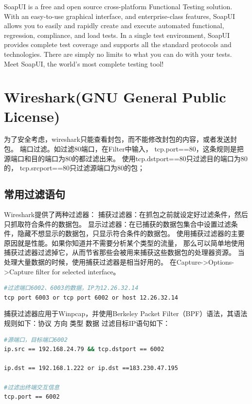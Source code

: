 \documentclass{book}
\begin{document}
SoapUI is a free and open source cross-platform Functional Testing solution. 
With an easy-to-use graphical interface, and enterprise-class features, 
SoapUI allows you to easily and rapidly create and execute automated functional, 
regression, compliance, and load tests. In a single test environment, 
SoapUI provides complete test coverage and supports all the standard protocols 
and technologies. There are simply no limits to what you can do with your tests. 
Meet SoapUI, the world's most complete testing tool!

\section{Wireshark(GNU General Public License)}

为了安全考虑，wireshark只能查看封包，而不能修改封包的内容，或者发送封包。
端口过滤。如过滤80端口，在Filter中输入，
tcp.port==80，这条规则是把源端口和目的端口为80的都过滤出来。
使用tcp.dstport==80只过滤目的端口为80的，
tcp.srcport==80只过滤源端口为80的包；

\subsection{常用过滤语句}

Wireshark提供了两种过滤器：
捕获过滤器：在抓包之前就设定好过滤条件，然后只抓取符合条件的数据包。
显示过滤器：在已捕获的数据包集合中设置过滤条件，隐藏不想显示的数据包，只显示符合条件的数据包。
使用捕获过滤器的主要原因就是性能。如果你知道并不需要分析某个类型的流量，
那么可以简单地使用捕获过滤器过滤掉它，从而节省那些会被用来捕获这些数据包的处理器资源。
当处理大量数据的时候，使用捕获过滤器是相当好用的。
在Capture->Options->Capture filter for selected interface。

\begin{lstlisting}[language=Bash]
#过滤端口6002、6003的数据，IP为12.26.32.14
tcp port 6003 or tcp port 6002 or host 12.26.32.14
\end{lstlisting}

捕获过滤器应用于Winpcap，并使用Berkeley Packet Filter（BPF）语法，其语法规则如下：协议 方向 类型 数据
过滤目标IP语句如下：

\begin{lstlisting}[language=Bash]
#源端口，目标端口6002
ip.src == 192.168.24.79 && tcp.dstport == 6002

ip.dst == 192.168.1.222 or ip.dst ==183.230.47.195

#过滤出终端交互信息
tcp.port == 6002
\end{lstlisting}
\end{document}
